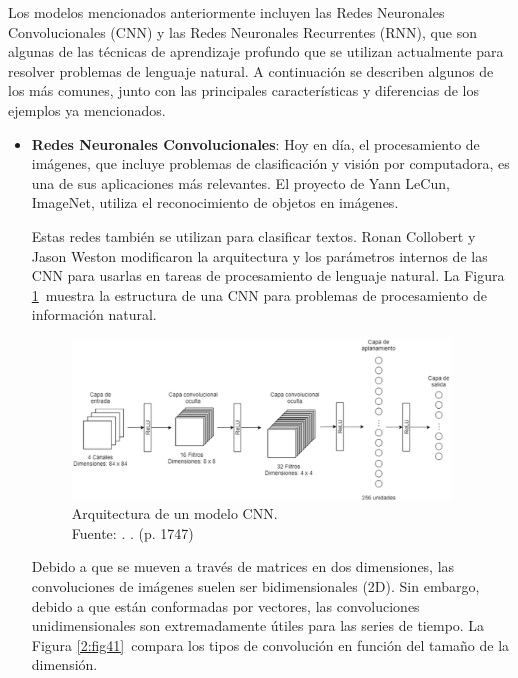 Los modelos mencionados anteriormente incluyen las Redes Neuronales Convolucionales (CNN) y las Redes Neuronales Recurrentes (RNN), que son algunas de las técnicas de aprendizaje profundo que se utilizan actualmente para resolver problemas de lenguaje natural. A continuación se describen algunos de los más comunes, junto con las principales características y diferencias de los ejemplos ya mencionados.

\begin{itemize}
	\item \textbf{Redes Neuronales Convolucionales}: Hoy en día, el procesamiento de imágenes, que incluye problemas de clasificación y visión por computadora, es una de sus aplicaciones más relevantes. El proyecto de Yann LeCun, ImageNet, utiliza el reconocimiento de objetos en imágenes.
	
	Estas redes también se utilizan para clasificar textos. Ronan Collobert y Jason Weston modificaron la arquitectura y los parámetros internos de las CNN para usarlas en tareas de procesamiento de lenguaje natural. La Figura \ref{2:fig40} muestra la estructura de una CNN para problemas de procesamiento de información natural. \parencite{bk_kamath2019deeplearning_nlp_sr}
	\begin{figure}[!ht]
		\begin{center}
			\includegraphics[width=0.95\textwidth]{2/figures/cnn_nlp.png}
			\caption[Arquitectura de un modelo CNN]{Arquitectura de un modelo CNN.\\
			Fuente: \cite{tec_kim2014convolutional}. . (p. 1747)}
			\label{2:fig40}
		\end{center}
	\end{figure}
	
	Debido a que se mueven a través de matrices en dos dimensiones, las convoluciones de imágenes suelen ser bidimensionales (2D). Sin embargo, debido a que están conformadas por vectores, las convoluciones unidimensionales son extremadamente útiles para las series de tiempo. La Figura \ref{2:fig41} compara los tipos de convolución en función del tamaño de la dimensión. \parencite{bk_rao2019nlp_pytorch}


\end{itemize}
